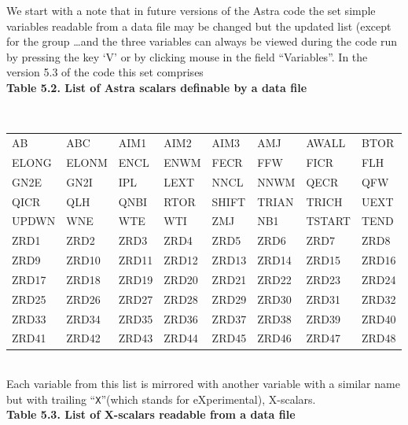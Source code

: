 We start with a note that in future versions of the Astra code the set
simple variables readable from a data file may be changed but the 
updated list (except for the group \dots and the three
variables 
can always be viewed during the code run by pressing the key `V' or 
by clicking mouse in the field ``Variables''.
In the version 5.3 of the code this set comprises
\medskip\\
\indent
{\bf Table 5.2. List of Astra scalars definable by a data file}
\nopagebreak
\\[10pt]
\nopagebreak
\noindent
{\tt
\begin{tabular}{|p{15mm}p{15mm}p{15mm}p{15mm}p{15mm}p{15mm}p{15mm}p{15mm}|}
\hline
AB	&ABC	&AIM1	&AIM2	&AIM3	&AMJ	&AWALL	&BTOR	\\
ELONG	&ELONM	&ENCL	&ENWM	&FECR	&FFW	&FICR	&FLH	\\
GN2E	&GN2I	&IPL	&LEXT	&NNCL	&NNWM	&QECR	&QFW	\\
QICR	&QLH	&QNBI	&RTOR	&SHIFT	&TRIAN	&TRICH	&UEXT	\\
UPDWN	&WNE	&WTE	&WTI	&ZMJ	&NB1	&TSTART	&TEND	\\
ZRD1	&ZRD2	&ZRD3	&ZRD4	&ZRD5	&ZRD6	&ZRD7	&ZRD8	\\
ZRD9	&ZRD10	&ZRD11	&ZRD12	&ZRD13	&ZRD14	&ZRD15	&ZRD16	\\
ZRD17	&ZRD18	&ZRD19	&ZRD20	&ZRD21	&ZRD22	&ZRD23	&ZRD24	\\
ZRD25	&ZRD26	&ZRD27	&ZRD28	&ZRD29	&ZRD30	&ZRD31	&ZRD32	\\
ZRD33	&ZRD34	&ZRD35	&ZRD36	&ZRD37	&ZRD38	&ZRD39	&ZRD40	\\
ZRD41	&ZRD42	&ZRD43	&ZRD44	&ZRD45	&ZRD46	&ZRD47	&ZRD48	\\
\hline
\end{tabular}
}\\[10pt]
Each variable from this list is mirrored with another variable with 
a similar name but with trailing ``{\tt X}''(which stands for
eXperimental), X-scalars.
\medskip\\
\indent
{\bf Table 5.3. List of X-scalars readable from a data file}
\nopagebreak
\\[10pt]
\nopagebreak
\noindent
